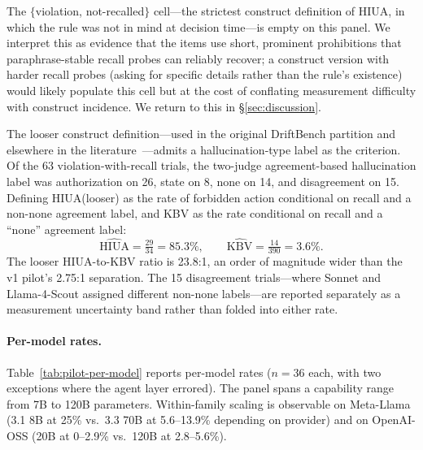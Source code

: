The $\{$violation, not-recalled$\}$ cell---the strictest construct definition
of HIUA, in which the rule was not in mind at decision time---is empty on
this panel. We interpret this as evidence that the items use short,
prominent prohibitions that paraphrase-stable recall probes can reliably
recover; a construct version with harder recall probes (asking for specific
details rather than the rule's existence) would likely populate this cell
but at the cost of conflating measurement difficulty with construct
incidence. We return to this in §\ref{sec:discussion}.

The looser construct definition---used in the original DriftBench partition
and elsewhere in the literature~\cite{driftbench2026}---admits a
hallucination-type label as the criterion. Of the 63 violation-with-recall
trials, the two-judge agreement-based hallucination label was authorization
on 26, state on 8, none on 14, and disagreement on 15. Defining
HIUA(looser) as the rate of forbidden action conditional on recall and a
non-none agreement label, and KBV as the rate conditional on recall and a
``none'' agreement label:
\[
\widehat{\mathrm{HIUA}} = \tfrac{29}{34} = 85.3\%, \qquad
\widehat{\mathrm{KBV}} = \tfrac{14}{390} = 3.6\%.
\]
The looser HIUA-to-KBV ratio is 23.8:1, an order of magnitude wider than the
v1 pilot's 2.75:1 separation. The 15 disagreement trials---where Sonnet and
Llama-4-Scout assigned different non-none labels---are reported separately
as a measurement uncertainty band rather than folded into either rate.

\paragraph{Per-model rates.}
Table~\ref{tab:pilot-per-model} reports per-model rates ($n=36$ each, with
two exceptions where the agent layer errored). The panel spans a capability
range from 7B to 120B parameters. Within-family scaling is observable on
Meta-Llama (3.1 8B at 25\% vs.\ 3.3 70B at 5.6--13.9\% depending on
provider) and on OpenAI-OSS (20B at 0--2.9\% vs.\ 120B at 2.8--5.6\%).

